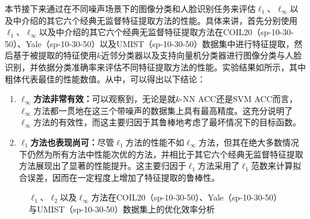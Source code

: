 本节接下来通过在不同噪声场景下的图像分类和人脸识别任务来评估$\ell_{1}$、$\ell_{\infty}$以及中介绍的其它六个经典无监督特征提取方法的性能。具体来讲，首先分别使用$\ell_{1}$、$\ell_{\infty}$以及中介绍的其它六个经典无监督特征提取方法在COIL20（sp-10-30-50）、Yale（sp-10-30-50）以及UMIST（sp-10-30-50）数据集中进行特征提取，然后基于被提取的特征使用$k$近邻分类器以及支持向量机分类器进行图像分类与人脸识别，并依据分类准确率来评估不同特征提取方法的性能。实验结果如所示，其中粗体代表最佳的性能数值。从中，可以得出以下结论：
\begin{enumerate}
    \item \textbf{$\ell_{\infty}$方法非常有效：}可以观察到，无论是就$k$-NN ACC还是SVM ACC而言，$\ell_{\infty}$方法都一贯地在这三个带噪声的数据集上具有最高精度。这充分说明了$\ell_{\infty}$方法的有效性，而这主要归因于其鲁棒地考虑了最坏情况下的目标函数。
    \item \textbf{$\ell_{1}$方法也表现尚可：}尽管$\ell_{1}$方法的性能不如$\ell_{\infty}$方法，但其在绝大多数情况下仍然为所有方法中性能次优的方法，并相比于其它六个经典无监督特征提取方法展现出了显著的性能提升。这主要归因于$\ell_{1}$方法采用了$\ell_{1}$范数来计算拟合误差，因而在一定程度上增加了特征提取的鲁棒性。
\end{enumerate}

\begin{figure}[!t]
    \centering
    \caption{$\ell_{1}$、$\ell_{2}$以及$\ell_{\infty}$方法在COIL20（sp-10-30-50）、Yale（sp-10-30-50）与UMIST（sp-10-30-50）数据集上的优化效率分析}
    \label{fig:runt}
\end{figure}
    
